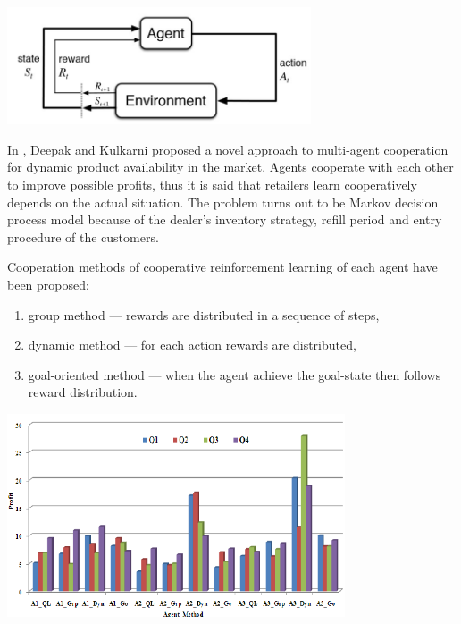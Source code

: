 \begin{center}
	\includegraphics[width=9cm, keepaspectratio]{diagrams/reinforcement_learning}
	\center
	\label{fig:ReinforcementLearning}
\end{center}
In \cite{RLRealtedWorkShops}, Deepak and Kulkarni proposed a novel approach to multi-agent cooperation for dynamic product availability in the market. Agents cooperate with each other to improve possible profits, thus it is said that retailers learn cooperatively depends on the actual situation. The problem turns out to be Markov decision process model because of the dealer's inventory strategy, refill period and entry procedure of the customers. 

Cooperation methods of cooperative reinforcement
learning of each agent have been proposed:
\begin{enumerate}
	\item group method --- rewards are distributed in a sequence of steps,
	\item dynamic method --- for each action rewards are distributed, 
	\item goal-oriented method --- when the agent achieve the goal-state then follows reward distribution. 
\end{enumerate}

\begin{center}
	\includegraphics[width=10cm, keepaspectratio]{diagrams/related_work/RLprofit}
	\center
	\label{fig:RLRelatedWork}
\end{center}

